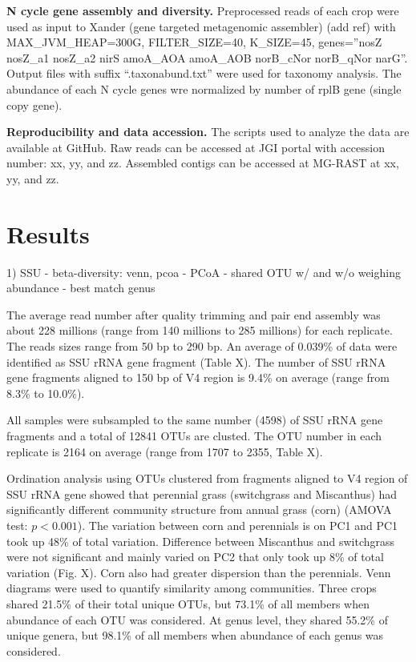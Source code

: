 \documentclass[12pt]{article}
\begin{document}
{\bf N cycle gene assembly and diversity.}
Preprocessed reads of each crop were used as input to Xander (gene targeted metagenomic assembler) (add ref) with MAX\_JVM\_HEAP=300G, FILTER\_SIZE=40, K\_SIZE=45, genes=''nosZ nosZ\_a1 nosZ\_a2 nirS amoA\_AOA amoA\_AOB norB\_cNor norB\_qNor narG''. Output files with suffix ``.taxonabund.txt'' were used for taxonomy analysis. The abundance of each N cycle genes wre normalized by number of rplB gene (single copy gene).

{\bf Reproducibility and data accession.}
The scripts used to analyze the data are available at GitHub. Raw reads can be accessed at JGI portal with accession number: xx, yy, and zz. Assembled contigs can be accessed at MG-RAST at xx, yy, and zz.

\section{Results}

1) SSU
- beta-diversity: venn, pcoa
  - PCoA
  - shared OTU w/ and w/o weighing abundance
  - best match genus

The average read number after quality trimming and pair end assembly was about 228 millions (range from 140 millions to 285 millions) for each replicate. The reads sizes range from 50 bp to 290 bp. An average of 0.039\% of data were identified as SSU rRNA gene fragment (Table X). The number of SSU rRNA gene fragments aligned to 150 bp of V4 region is 9.4\% on average (range from 8.3\% to 10.0\%).

All samples were subsampled to the same number (4598) of SSU rRNA gene fragments and a total of 12841 OTUs are clusted. The OTU number in each replicate is 2164 on average (range from 1707 to 2355, Table X).

Ordination analysis using OTUs clustered from fragments aligned to V4 region of SSU rRNA gene showed that perennial grass (switchgrass and Miscanthus) had significantly different community structure from annual grass (corn) (AMOVA test: $p < 0.001$). The variation between corn and perennials is on PC1 and PC1 took up 48\% of total variation. Difference between Miscanthus and switchgrass were not significant and mainly varied on PC2 that only took up 8\% of total variation (Fig. X). Corn also had greater dispersion than the perennials. Venn diagrams were used to quantify similarity among communities. Three crops shared 21.5\% of their total unique OTUs, but 73.1\% of all members when abundance of each OTU was considered. At genus level, they shared 55.2\% of unique genera, but 98.1\% of all members when abundance of each genus was considered.
\end{document}
